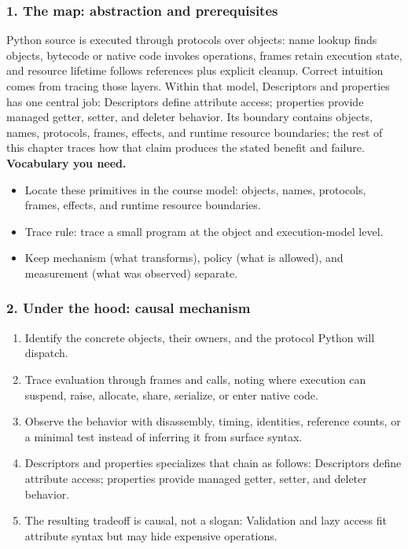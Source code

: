 \subsubsection*{1. The map: abstraction and prerequisites}
Python source is executed through protocols over objects: name lookup finds objects, bytecode or native code invokes operations, frames retain execution state, and resource lifetime follows references plus explicit cleanup. Correct intuition comes from tracing those layers.
Within that model, Descriptors and properties has one central job: Descriptors define attribute access; properties provide managed getter, setter, and deleter behavior. Its boundary contains objects, names, protocols, frames, effects, and runtime resource boundaries; the rest of this chapter traces how that claim produces the stated benefit and failure.
\textbf{Vocabulary you need.}\begin{itemize}
\item Locate these primitives in the course model: objects, names, protocols, frames, effects, and runtime resource boundaries.
\item Trace rule: trace a small program at the object and execution-model level.
\item Keep mechanism (what transforms), policy (what is allowed), and measurement (what was observed) separate.
\end{itemize}
\subsubsection*{2. Under the hood: causal mechanism}\begin{enumerate}
\item Identify the concrete objects, their owners, and the protocol Python will dispatch.
\item Trace evaluation through frames and calls, noting where execution can suspend, raise, allocate, share, serialize, or enter native code.
\item Observe the behavior with disassembly, timing, identities, reference counts, or a minimal test instead of inferring it from surface syntax.
\item Descriptors and properties specializes that chain as follows: Descriptors define attribute access; properties provide managed getter, setter, and deleter behavior.
\item The resulting tradeoff is causal, not a slogan: Validation and lazy access fit attribute syntax but may hide expensive operations.
\end{enumerate}
